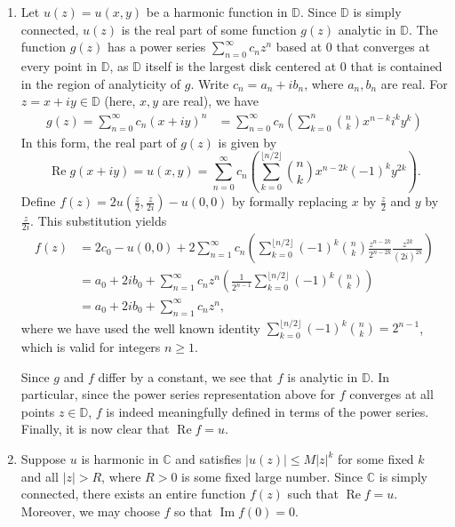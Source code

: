 \documentclass[11pt]{book}
\theoremstyle{definition}
\renewcommand{\Re}{\operatorname{Re}}
\renewcommand{\Im}{\operatorname{Im}}
\begin{document}
\begin{enumerate}
  \item Let $u(z) = u(x,y)$ be a harmonic function in $\mathbb D$.  Since $\mathbb D$ is simply connected, $u(z)$ is the real part of some function $g(z)$ analytic in $\mathbb D$.  The function $g(z)$ has a power series $\sum_{n=0}^\infty c_n z^n$ based at $0$ that converges at every point in $\mathbb D$, as $\mathbb D$ itself is the largest disk centered at $0$ that is contained in the region of analyticity of $g$.  Write $c_n = a_n + ib_n$, where $a_n, b_n$ are real. For $z = x+iy\in \mathbb D$ (here, $x,y$ are real), we have
    \begin{align*}
      g(z) = \sum_{n=0}^\infty c_n (x+iy)^n &= \sum_{n=0}^\infty c_n \left( \sum_{k=0}^n {n\choose k} x^{n-k} i^k y^k \right) 
    \end{align*}
    In this form, the real part of $g(z)$ is given by 
    \[ \Re g(x+iy) = u(x, y) = \sum_{n=0}^\infty c_n \left( \sum_{k=0}^{\lfloor n/2 \rfloor} {n\choose k} x^{n-2k} (-1)^k y^{2k} \right). \] 
    Define $f(z) = 2 u( \tfrac z 2, \tfrac{z}{2i} ) - u(0, 0)$ by formally replacing $x$ by $\tfrac z 2$ and $y$ by $\tfrac{z}{2i}$.  This substitution yields
    \begin{align*}
      f(z) &= 2c_0 - u(0,0) + 2\sum_{n=1}^\infty c_n \left( \sum_{k=0}^{\lfloor n/2 \rfloor} (-1)^k{n\choose k}  \frac{z^{n-2k}}{2^{n-2k}}  \frac{z^{2k}}{(2i)^{2k}} \right) \\
      &= a_0 + 2i b_0 + \sum_{n=1}^\infty c_n z^n \left( \frac{1}{2^{n-1}} \sum_{k=0}^{\lfloor n/2 \rfloor} (-1)^k {n\choose k} \right)  \\
      &= a_0 + 2ib_0 + \sum_{n=1}^\infty c_n z^n, 
    \end{align*}
    where we have used the well known identity $\sum_{k=0}^{\lfloor n/2\rfloor} (-1)^k {n\choose k} = 2^{n-1}$, which is valid for integers $n\geq 1$. 
    
    Since $g$ and $f$ differ by a constant, we see that $f$ is analytic in $\mathbb D$.  In particular, since the power series representation above for $f$ converges at all points $z\in \mathbb D$, $f$ is indeed meaningfully defined in terms of the power series.  Finally, it is now clear that $\Re f = u$. 
    
  \item  Suppose $u$ is harmonic in $\mathbb C$ and satisfies $|u(z)| \leq M |z|^k$ for some fixed $k$ and all $|z| > R$, where $R>0$ is some fixed large number.  Since $\mathbb C$ is simply connected, there exists an entire function $f(z)$ such that $\Re f = u$.  Moreover, we may choose $f$ so that $\Im f(0) = 0$.  
    

\end{enumerate}
\end{document}
